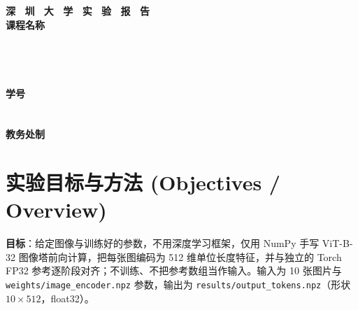 \documentclass[a4paper,12pt]{article}
\begin{document}
\begin{titlepage}
    \centering
    \vspace*{2cm}
    \Huge{\textbf{深 \ 圳 \ 大 \ 学 \ 实 \ 验  \ 报 \ 告}}\\[1.5cm]

    {\Large\textbf{课程名称}\quad\underline{}}\\[0.5cm]
{\Large
\noindent{}
\underline{}}\\[0.5cm]
{\Large
\noindent{}
\underline{}}\\[0.5cm]
{\Large
\noindent{}
\underline{}}\\[0.5cm]
{\Large
\noindent{}
\underline{}}\\[0.5cm]
{\Large
\noindent{}
\underline{}
\hspace{0.5cm}
\textbf{学号}
\underline{}}\\[0.5cm]
{\Large
\noindent{}
\underline{}}\\[0.5cm]
{\Large
\noindent{}
\underline{}}\\[1.5cm]

    \vfill
    \Large{\textbf{教务处制}}
\end{titlepage}

\newpage


\section{实验目标与方法 (Objectives / Overview)}

\textbf{目标}：给定图像与训练好的参数，不用深度学习框架，仅用 NumPy 手写 ViT-B-32 图像塔前向计算，把每张图编码为 512 维单位长度特征，并与独立的 Torch FP32 参考逐阶段对齐；不训练、不把参考数组当作输入。输入为 10 张图片与 \texttt{weights/image\_encoder.npz} 参数，输出为 \texttt{results/output\_tokens.npz}（形状 $10\times512$，float32）。
\end{document}
